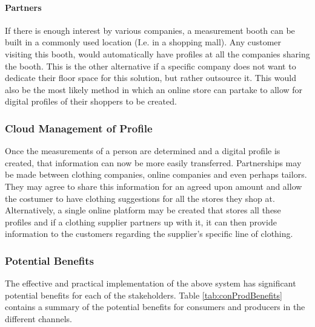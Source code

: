 \paragraph{Partners}
If there is enough interest by various companies, a measurement booth can be built in a commonly used location (I.e. in a shopping mall). Any customer visiting this booth, would automatically have profiles at all the companies sharing the booth. This is the other alternative if a specific company does not want to dedicate their floor space for this solution, but rather outsource it. This would also be the most likely method in which an online store can partake to allow for digital profiles of their shoppers to be created.

\subsubsection{Cloud Management of Profile}
Once the measurements of a person are determined and a digital profile is created, that information can now be more easily transferred. Partnerships may be made between clothing companies, online companies and even perhaps tailors. They may agree to share this information for an agreed upon amount and allow the costumer to have clothing suggestions for all the stores they shop at. Alternatively, a single online platform may be created that stores all these profiles and if a clothing supplier partners up with it, it can then provide information to the customers regarding the supplier's specific line of clothing.

\subsubsection{Potential Benefits}
The effective and practical implementation of the above system has significant potential benefits for each of the stakeholders. Table \ref{tab:conProdBenefits} contains a summary of the potential benefits for consumers and producers in the different channels.

